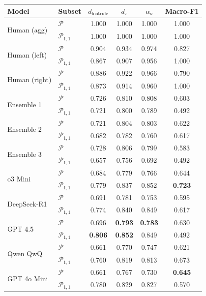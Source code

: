{\small
\setlength{\tabcolsep}{4pt}
\begin{tabular}{llcccc}
\toprule
Model & Subset & $d_\text{footrule}$ & $d_\tau$ & $\alpha_o$ & Macro-F1 \\
\midrule
\multirow{2}{*}{Human (agg)} & $\mathcal{P}$ & 1.000 & 1.000 & 1.000 & 1.000 \\
 & $\mathcal{P}_{1,1}$ & 1.000 & 1.000 & 1.000 & 1.000 \\
\multirow{2}{*}{Human (left)} & $\mathcal{P}$ & 0.904 & 0.934 & 0.974 & 0.827 \\
 & $\mathcal{P}_{1,1}$ & 0.867 & 0.907 & 0.956 & 1.000 \\
\multirow{2}{*}{Human (right)} & $\mathcal{P}$ & 0.886 & 0.922 & 0.966 & 0.790 \\
 & $\mathcal{P}_{1,1}$ & 0.873 & 0.914 & 0.960 & 1.000 \\
\midrule
\multirow{2}{*}{Ensemble 1} & $\mathcal{P}$ & 0.726 & 0.810 & 0.808 & 0.603 \\
 & $\mathcal{P}_{1,1}$ & 0.721 & 0.800 & 0.789 & 0.492 \\
\multirow{2}{*}{Ensemble 2} & $\mathcal{P}$ & 0.721 & 0.804 & 0.803 & 0.622 \\
 & $\mathcal{P}_{1,1}$ & 0.682 & 0.782 & 0.760 & 0.617 \\
\multirow{2}{*}{Ensemble 3} & $\mathcal{P}$ & 0.728 & 0.806 & 0.799 & 0.583 \\
 & $\mathcal{P}_{1,1}$ & 0.657 & 0.756 & 0.692 & 0.492 \\
\midrule
\multirow{2}{*}{o3 Mini} & $\mathcal{P}$ & 0.684 & 0.779 & 0.766 & 0.644 \\
 & $\mathcal{P}_{1,1}$ & 0.779 & 0.837 & 0.852 & \textbf{0.723} \\
\multirow{2}{*}{DeepSeek-R1} & $\mathcal{P}$ & 0.691 & 0.781 & 0.753 & 0.595 \\
 & $\mathcal{P}_{1,1}$ & 0.774 & 0.840 & 0.849 & 0.617 \\
\multirow{2}{*}{GPT 4.5} & $\mathcal{P}$ & 0.696 & \textbf{0.793} & \textbf{0.783} & 0.630 \\
 & $\mathcal{P}_{1,1}$ & \textbf{0.806} & \textbf{0.852} & 0.849 & 0.492 \\
\multirow{2}{*}{Qwen QwQ} & $\mathcal{P}$ & 0.661 & 0.770 & 0.747 & 0.621 \\
 & $\mathcal{P}_{1,1}$ & 0.760 & 0.819 & 0.813 & 0.673 \\
\multirow{2}{*}{GPT 4o Mini} & $\mathcal{P}$ & 0.661 & 0.767 & 0.730 & \textbf{0.645} \\
 & $\mathcal{P}_{1,1}$ & 0.780 & 0.829 & 0.827 & 0.570 \\

\end{tabular}}
